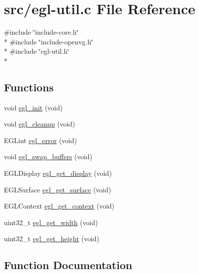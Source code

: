 \hypertarget{egl-util_8c}{}\section{src/egl-\/util.c File Reference}
\label{egl-util_8c}
{\ttfamily \#include \char`\"{}include-\/core.\+h\char`\"{}}\\*
{\ttfamily \#include \char`\"{}include-\/openvg.\+h\char`\"{}}\\*
{\ttfamily \#include \char`\"{}egl-\/util.\+h\char`\"{}}\\*
\subsection*{Functions}
\begin{DoxyCompactItemize}
\item 
void \hyperlink{egl-util_8c_abcd369898b2df54992c9432da23c6420}{egl\+\_\+init} (void)
\item 
void \hyperlink{egl-util_8c_ac5a71c68f26cf3a6f2308359ae3310a1}{egl\+\_\+cleanup} (void)
\item 
E\+G\+Lint \hyperlink{egl-util_8c_a3196b113c4cd43f8f15179cd7e9384f6}{egl\+\_\+error} (void)
\item 
void \hyperlink{egl-util_8c_adda4d601a726246d7e25ea003624d4db}{egl\+\_\+swap\+\_\+buffers} (void)
\item 
E\+G\+L\+Display \hyperlink{egl-util_8c_a3a132ec8cb5c0170d98e0f45153d0704}{egl\+\_\+get\+\_\+display} (void)
\item 
E\+G\+L\+Surface \hyperlink{egl-util_8c_ae8230d60c66dcaf2538f97f96dcef346}{egl\+\_\+get\+\_\+surface} (void)
\item 
E\+G\+L\+Context \hyperlink{egl-util_8c_a3e16721e576073b176ae5cf4b5ad1a39}{egl\+\_\+get\+\_\+context} (void)
\item 
uint32\+\_\+t \hyperlink{egl-util_8c_a08fd0922be4136a0b9648f32e8ddf4fe}{egl\+\_\+get\+\_\+width} (void)
\item 
uint32\+\_\+t \hyperlink{egl-util_8c_a36ec4f686ec497e0757b5701421ab495}{egl\+\_\+get\+\_\+height} (void)
\end{DoxyCompactItemize}


\subsection{Function Documentation}
\hypertarget{egl-util_8c_ac5a71c68f26cf3a6f2308359ae3310a1}{}
